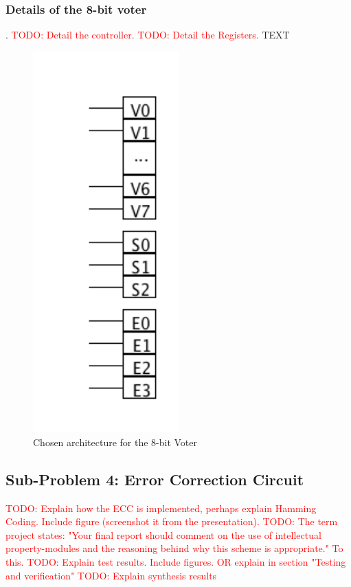 \documentclass[a4paper]{IEEEtran}
\newcommand\TODO[1]{\textcolor{red}{TODO:#1}}
\newcommand\todo[1]{\TODO{#1}}
\begin{document}
\subsubsection{ Details of the 8-bit voter}.
\todo{ Detail the controller.}
\break
\break
\todo{ Detail the Registers.}
\break
\break
TEXT
\begin{figure}[h!]
  \centering
      \includegraphics[width=0.5\textwidth]{Figures/Solution/Registers}
  \caption{Chosen architecture for the 8-bit Voter}
  \label{fig:Registers}
\end{figure}

\subsection{Sub-Problem 4: Error Correction Circuit}
\todo{ Explain how the ECC is implemented, perhaps explain Hamming Coding. Include figure (screenshot it from the presentation). }
\break
\break
\todo{ The term project states: "Your final report should comment on the use of intellectual property-modules and the reasoning behind why this scheme is appropriate." To this.}
\break
\break
\todo{ Explain test results. Include figures. OR explain in section "Testing and verification" }
\break
\break
\todo{ Explain synthesis results}
\end{document}
